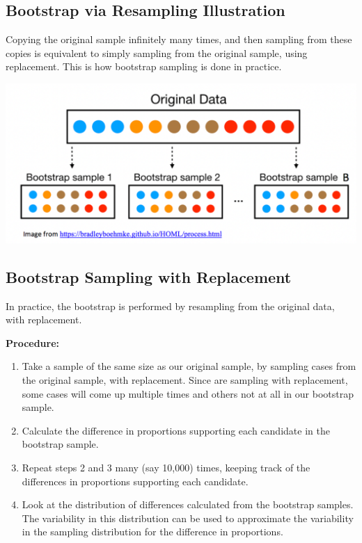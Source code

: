 \documentclass[]{book}
\begin{document}
\subsection{Bootstrap via Resampling
Illustration}\label{bootstrap-via-resampling-illustration}

Copying the original sample infinitely many times, and then sampling
from these copies is equivalent to simply sampling from the original
sample, using replacement. This is how bootstrap sampling is done in
practice.

\includegraphics[width=0.7\linewidth]{Bootstrap}

\subsection{Bootstrap Sampling with
Replacement}\label{bootstrap-sampling-with-replacement}

In practice, the bootstrap is performed by resampling from the original
data, with replacement.

\textbf{Procedure:}

\begin{enumerate}
\def\labelenumi{\arabic{enumi}.}
\item
  Take a sample of the same size as our original sample, by sampling
  cases from the original sample, with replacement. Since are sampling
  with replacement, some cases will come up multiple times and others
  not at all in our bootstrap sample.
\item
  Calculate the difference in proportions supporting each candidate in
  the bootstrap sample.
\item
  Repeat steps 2 and 3 many (say 10,000) times, keeping track of the
  differences in proportions supporting each candidate.
\item
  Look at the distribution of differences calculated from the bootstrap
  samples. The variability in this distribution can be used to
  approximate the variability in the sampling distribution for the
  difference in proportions.
\end{enumerate}
\end{document}
